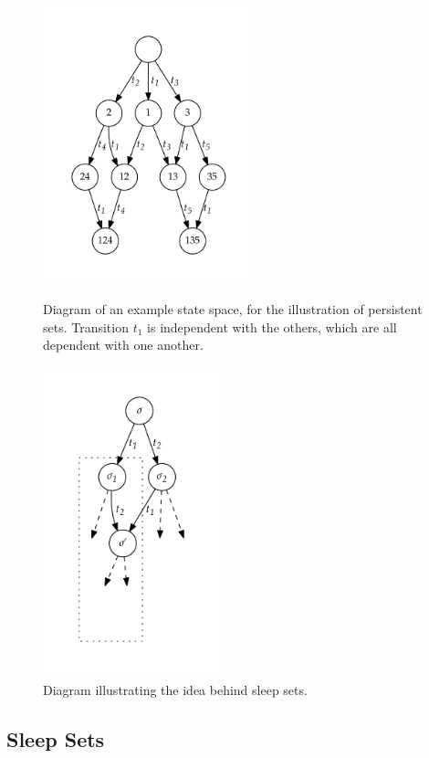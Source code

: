 \documentclass[12pt,a4paper,twoside,openany]{report}
\begin{document}
\begin{figure}
	\centering
	\begin{minipage}{.45\textwidth}
		\centering
		\includegraphics[height=8cm]{persistent1}
		\caption[Diagram of an example state space, for
		the illustration of persistent sets.]
		{Diagram of an example state space, for
			the illustration of persistent sets. Transition
			$t_1$ is independent with the others, which are
			all dependent with one another.}
		\label{fig:persistent}
	\end{minipage}%
	\qquad
	\begin{minipage}{.45\textwidth}
		\centering
		\includegraphics[height=9cm]{sleep}
		\caption{Diagram illustrating the
			idea behind sleep sets.}
		\label{fig:sleep}
	\end{minipage}
	
\end{figure}

\subsection{Sleep Sets}
\label{sec:sleep-prep}
\end{document}
